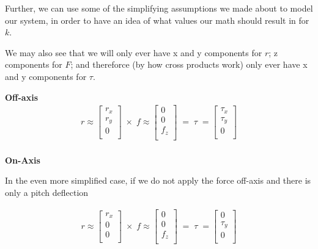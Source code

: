\documentclass[preprint,12pt,3p]{elsarticle}
\begin{document}
Further, we can use some of the simplifying assumptions we made about to model our system, in order to have an idea of what values our math should result in for $k$.

We may also see that we will only ever have x and y components for $r$; z components for $F$; and thereforce (by how cross products work) only ever have x and y components for $\tau$.

\textbf{Off-axis}
\begin{align}
r \approx
\begin{bmatrix}
    r_x       \\
    r_y       \\
    0       \\
\end{bmatrix} \; \times \;
f \approx
\begin{bmatrix}
    0       \\
    0       \\
    f_z      \\
\end{bmatrix} \; =  \; \tau \; = 
\begin{bmatrix}
    \tau_x       \\
    \tau_y       \\
    0      \\
\end{bmatrix}\\
\end{align}


\textbf{On-Axis}

In the even more simplified case, if we do not apply the force off-axis and there is only a pitch
deflection

\begin{align}
r \approx
\begin{bmatrix}
    r_x       \\
    0       \\
    0       \\
\end{bmatrix} \; \times \;
f \approx
\begin{bmatrix}
    0       \\
    0       \\
    f_z      \\
\end{bmatrix} \; =  \; \tau \; = 
\begin{bmatrix}
    0 \\
    \tau_y       \\
    0      \\
\end{bmatrix}\\
\end{align}
\end{document}

